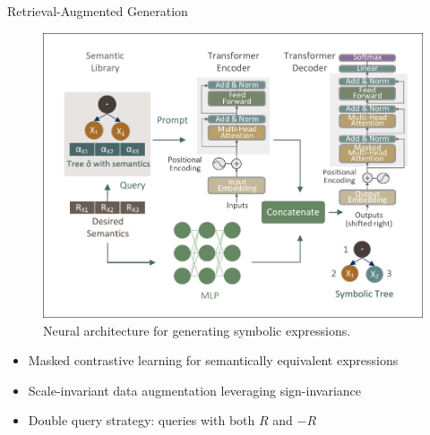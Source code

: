 \documentclass[final]{beamer}
\newlength{\onecolwid}
\begin{document}
\begin{frame}[t]
\begin{columns}[t]
\begin{column}{\onecolwid}
                \begin{block}{Retrieval-Augmented Generation}
                    \begin{figure}
                        \centering
                        \includegraphics[width=\linewidth, trim=25 20 15 10, clip]{figs/Transformer.pdf}
                        \caption{Neural architecture for generating symbolic expressions.}
                    \end{figure}


                    \begin{itemize}
                        \item Masked contrastive learning for semantically equivalent expressions
                        \item Scale-invariant data augmentation leveraging sign-invariance
                        \item Double query strategy: queries with both $R$ and $-R$
                    \end{itemize}


\end{block}
\end{column}
\end{columns}
\end{frame}
\end{document}
